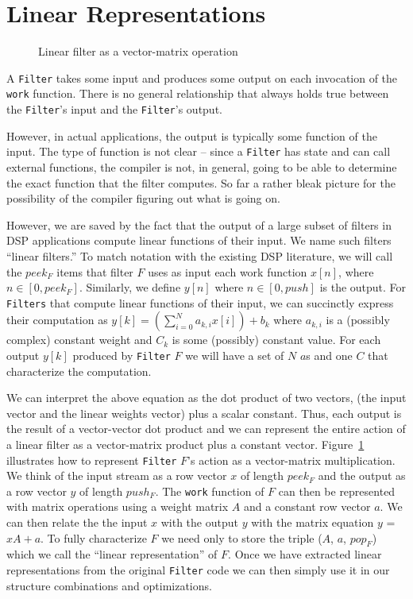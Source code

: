 \section{Linear Representations}
\begin{figure}
\center
\epsfxsize=3.0in
\caption{Linear filter as a vector-matrix operation}
\label{fig:overview-matrix}
\end{figure}

A {\tt Filter} takes some input and produces some output on
each invocation of the {\tt work} function. There is no general 
relationship that always holds true between the {\tt Filter}'s input and
the {\tt Filter}'s output.

However, in actual applications, the output is typically some function of the input. 
The type of function is not clear -- since a {\tt Filter} has state and can call
external functions, the compiler is not, in general, going to be able to determine 
the exact function that the filter computes. So far a rather bleak picture for 
the possibility of the compiler figuring out what is going on.

However, we are saved by the fact that the output of a large subset of filters 
in DSP applications compute linear functions of their input. We name
such filters ``linear filters.'' To match notation with the existing DSP 
literature, we will call the $peek_F$ items that filter $F$ uses as input
each work function $x[n]$, where  $n\in[0,peek_F]$. Similarly, we  
define  $y[n]$ where  $n\in[0,push]$ is the output. For {\tt Filters} that
compute linear functions of their input, we can succinctly express their
computation as $y[k] = (\sum_{i=0}^{N} a_{k,i}x[i])+b_{k}$ 
where $a_{k,i}$ is a (possibly complex) constant weight and $C_{k}$ is some
(possibly) constant value. For each output $y[k]$ produced by {\tt Filter}
$F$ we will have a set of $N$ $a$s and one $C$ that characterize the computation.

We can interpret the above equation as the dot product of two vectors, (the input 
vector and the linear weights vector) plus a scalar constant. Thus, each output is the result
of a vector-vector dot product and we can represent the entire action of a linear filter 
as a vector-matrix product plus a constant vector. Figure~\ref{fig:overview-matrix} 
illustrates how to represent {\tt Filter} $F$'s action as a vector-matrix 
multiplication. We think of the input stream as a row vector $x$ of length $peek_F$
and the output as a row vector $y$ of length $push_F$. The {\tt work} function
of $F$ can then be represented with matrix operations using a weight matrix $A$ and 
a constant row vector $a$. We can then relate the the input $x$ with the output $y$
with the matrix equation $y$ = $xA + a$. To fully characterize $F$ we need only to 
store the triple ($A$, $a$, $pop_F$) which we call the ``linear representation'' of $F$. 
Once we have extracted linear representations from the original {\tt Filter} code we can
then simply use it in our structure combinations and optimizations.

